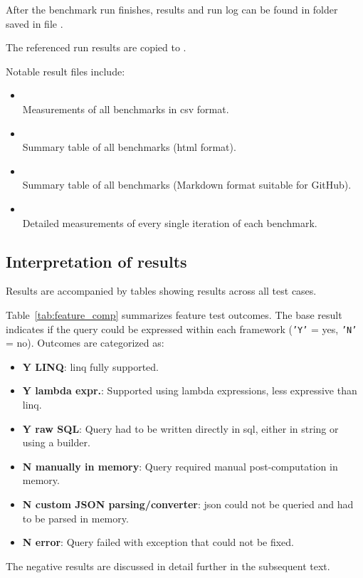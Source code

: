 After the benchmark run finishes, results and run log can be found in folder  saved in file .

\smallskip
The referenced run results are copied to .

\smallskip
Notable result files include:
\begin{itemize}
    \item {}\\
    Measurements of all benchmarks in \acrshort{csv} format.

    \item {}\\
    Summary table of all benchmarks (\acrshort{html} format).

    \item {}\\
    Summary table of all benchmarks (Markdown format suitable for GitHub).

    \item {}\\
    Detailed measurements of every single iteration of each benchmark.
\end{itemize}

\subsection{Interpretation of results}
Results are accompanied by tables showing results across all test cases. 

Table~\ref{tab:feature_comp} summarizes feature test outcomes. The base result indicates if the query could be expressed within each framework (\texttt{'Y'} = yes, \texttt{'N'} = no). Outcomes are categorized as:
\begin{itemize}
    \item \textbf{Y LINQ}: \acrshort{linq} fully supported.
    \item \textbf{Y lambda expr.}: Supported using lambda expressions, less expressive than \acrshort{linq}.
    \item \textbf{Y raw SQL}: Query had to be written directly in \acrshort{sql}, either in string or using a builder.
    \item \textbf{N manually in memory}: Query required manual post-computation in memory.
    \item \textbf{N custom JSON parsing/converter}: \acrshort{json} could not be queried and had to be parsed in memory.
    \item \textbf{N error}: Query failed with exception that could not be fixed. 
\end{itemize}
The negative results are discussed in detail further in the subsequent text.

